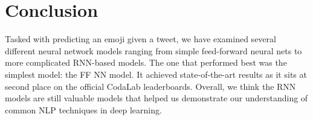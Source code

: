 \documentclass[11pt,a4paper]{article}
\begin{document}
\section{Conclusion}
Tasked with predicting an emoji given a tweet, we have examined several different neural network models ranging from simple feed-forward neural nets to more complicated RNN-based models. The one that performed best was the simplest model: the FF NN model. It achieved state-of-the-art results as it sits at second place on the official CodaLab leaderboards. Overall, we think the RNN models are still valuable models that helped us demonstrate our understanding of common NLP techniques in deep learning.

	

%
%
\nocite{*}





\appendix


	
\end{document}
